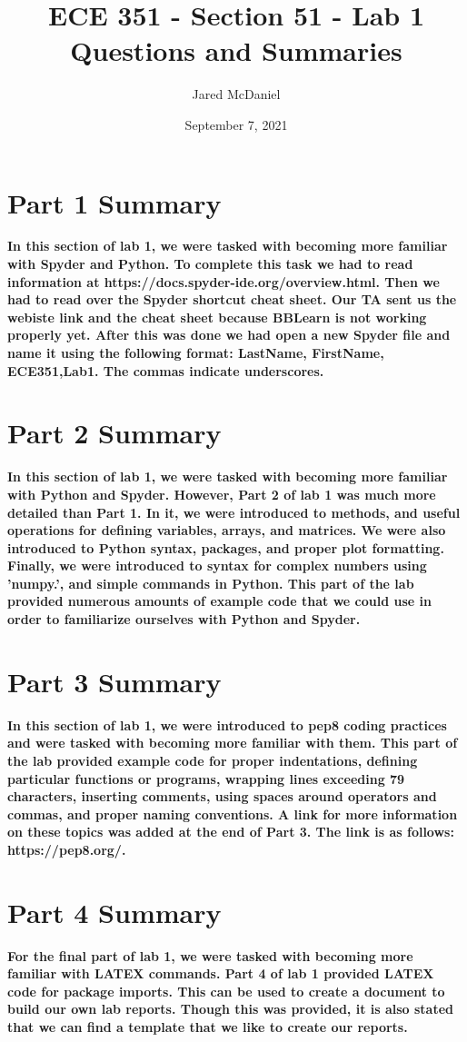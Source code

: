 \documentclass[11pt]{article}
\title{ECE 351 - Section 51 - Lab 1 Questions and Summaries}
\author{Jared McDaniel}
\date{September 7, 2021}
\begin{document}
\maketitle


\section{Part 1 Summary}
\textbf{In this section of lab 1, we were tasked with becoming more familiar with Spyder and Python. To complete this task we had to read information at https://docs.spyder-ide.org/overview.html. Then we had to read over the Spyder shortcut cheat sheet. Our TA sent us the webiste link and the cheat sheet because BBLearn is not working properly yet. After this was done we had open a new Spyder file and name it using the following format:  LastName, FirstName, ECE351,Lab1. The commas indicate underscores.
}

\section{Part 2 Summary}
\textbf{In this section of lab 1, we were tasked with becoming more familiar with Python and Spyder. However, Part 2 of lab 1 was much more detailed than Part 1. In it, we were introduced to methods, and useful operations for defining variables, arrays, and matrices. We were also introduced to Python syntax, packages, and proper plot formatting. Finally, we were introduced to syntax for complex numbers using 'numpy.', and simple commands in Python. This part of the lab provided numerous amounts of example code that we could use in order to familiarize ourselves with Python and Spyder.}

\section{Part 3 Summary}
\textbf{In this section of lab 1, we were introduced to pep8 coding practices and were tasked with becoming more familiar with them. This part of the lab provided example code for proper indentations, defining particular functions or programs, wrapping lines exceeding 79 characters, inserting comments, using spaces around operators and commas, and proper naming conventions. A link for more information on these topics was added at the end of Part 3. The link is as follows:  https://pep8.org/.}

\section{Part 4 Summary}
\textbf{For the final part of lab 1, we were tasked with becoming more familiar with LATEX commands. Part 4 of lab 1 provided LATEX code for package imports. This can be used to create a document to build our own lab reports. Though this was provided, it is also stated that we can find a template that we like to create our reports.}
\end{document}

